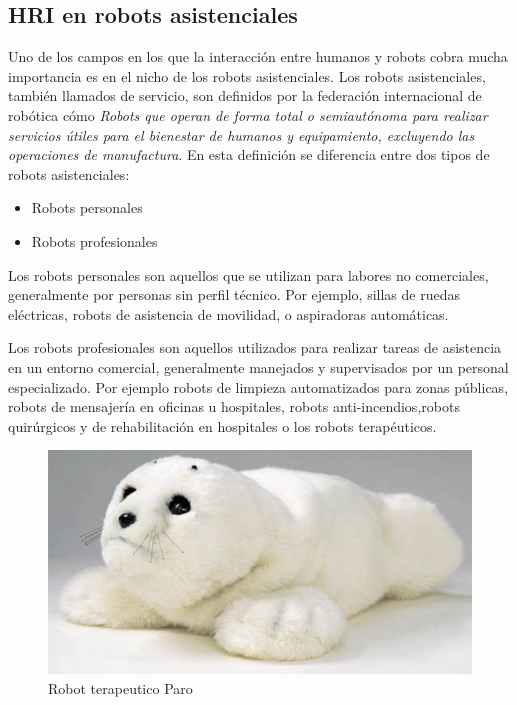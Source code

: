  \subsection{HRI en robots asistenciales}
 Uno de los campos en los que la interacción entre humanos y robots cobra mucha importancia es en el nicho de los robots asistenciales. Los robots asistenciales, también llamados de servicio, son definidos por la federación internacional de robótica cómo \textit{Robots que operan de forma total o semiautónoma para realizar servicios útiles para el bienestar de humanos y equipamiento, excluyendo las operaciones de manufactura}\cite{ifr-service-robots}. En esta definición se diferencia entre dos tipos de robots asistenciales:
 \begin{itemize}
 	\item Robots personales
 	\item Robots profesionales
 \end{itemize}
 
 Los robots personales son aquellos que se utilizan para labores no comerciales, generalmente por personas sin perfil técnico. Por ejemplo, sillas de ruedas eléctricas, robots de asistencia de movilidad, o aspiradoras automáticas.
 
 Los robots profesionales son aquellos utilizados para realizar tareas de asistencia en un entorno comercial, generalmente manejados y supervisados por un personal especializado. Por ejemplo robots de limpieza automatizados para zonas públicas, robots de mensajería en oficinas u hospitales, robots anti-incendios,robots quirúrgicos y de rehabilitación en hospitales o los robots terapéuticos.
 \begin{figure}
	\centering
	\includegraphics[width=0.8\linewidth]{imagenes/parorobot.JPG}
	\caption{Robot terapeutico Paro}
	\label{fig:parorobot}
\end{figure} 

